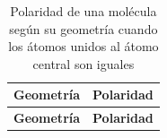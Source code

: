 \begin{enumerate}[label=\numberballmDarkTeal]
        \begin{longtable}{@{}cc@{}}
            \caption{Polaridad de una molécula según su geometría cuando los átomos unidos al átomo central son iguales} \\
            \toprule
            \textbf{Geometría} & \textbf{Polaridad} \\
            \midrule
            \endfirsthead
            \toprule
            \textbf{Geometría} & \textbf{Polaridad} \\

\end{longtable}
\end{enumerate}
